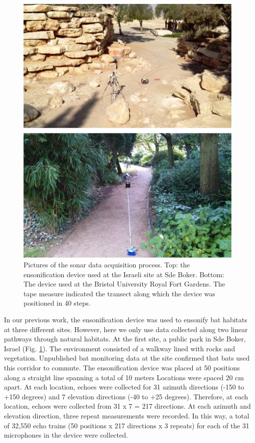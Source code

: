 \documentclass[preprint,5p]{elsarticle}
\begin{document}
\begin{figure}[tb]
	\centering
	\includegraphics[width=1\linewidth]{figures/datacollection}
	\caption{Pictures of the sonar data acquisition process. Top: the ensonification device used at the Israeli site at Sde Boker. Bottom: The device used at the Bristol University Royal Fort Gardens. The tape measure indicated the transect along which the device was positioned in 40 steps.}
	\label{fig:datacollection}
\end{figure}

In our previous work, the ensonification device was used to ensonify bat habitats at three different sites. However, here we only use data collected along two linear pathways through natural habitats. At the first site, a public park in Sde Boker, Israel (Fig. \ref{fig:datacollection}). The environment consisted of a walkway lined with rocks and vegetation. Unpublished bat monitoring data at the site confirmed that bats used this corridor to commute. The ensonification device was placed at 50 positions along a straight line spanning a total of 10 meters Locations were spaced 20 cm apart. At each location, echoes were collected for 31 azimuth directions (-150 to +150 degrees) and 7 elevation directions (-40 to +25 degrees). Therefore, at each location, echoes were collected from 31 x 7 = 217 directions. At each azimuth and elevation direction, three repeat measurements were recorded. In this way, a total of 32,550 echo trains (50 positions x 217 directions x 3 repeats) for each of the 31 microphones in the device were collected.
\end{document}
